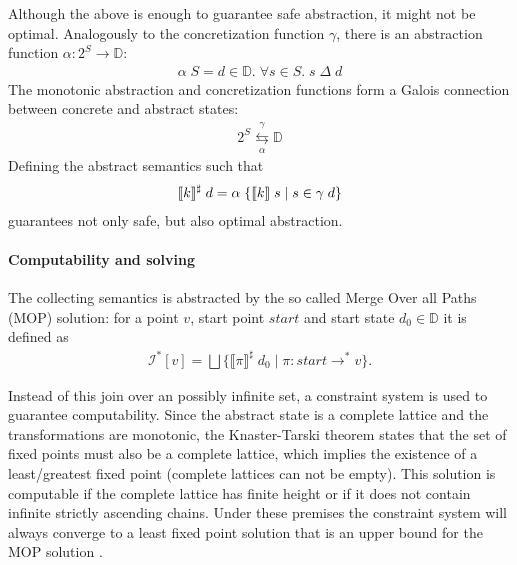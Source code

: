 Although the above is enough to guarantee safe abstraction, it might not be optimal.
Analogously to the concretization function $\gamma$, there is an abstraction function $\alpha : 2^S \to \mathbb{D}$:
\begin{align}
\alpha \; S = d \in \mathbb{D}. \; \forall s \in S. \; s \;\Delta\; d
\end{align}
The monotonic abstraction and concretization functions form a Galois connection between concrete and abstract states:
\begin{align}
2^S \overset{\gamma}{\underset{\alpha} {\leftrightarrows}} \mathbb{D}
\end{align}
Defining the abstract semantics such that
\begin{align}
\llbracket k \rrbracket^\sharp \; d = \alpha \; \{ \llbracket k \rrbracket \; s \; | \; s \in \gamma \; d\}
\end{align}
guarantees not only safe, but also optimal abstraction.


\paragraph*{Computability and solving}
The collecting semantics is abstracted by the so called Merge Over all Paths (MOP) solution: for a point $v$, start point $start$ and start state $d_0 \in \mathbb{D}$ it is defined as
\begin{align}
\mathcal{I}^*[v] = \bigsqcup \{\llbracket \pi \rrbracket^\sharp \; d_0 \; | \; \pi : start \to^* v\}.
\end{align}

Instead of this join over an possibly infinite set, a constraint system is used to guarantee computability.
Since the abstract state is a complete lattice and the transformations are monotonic, the Knaster-Tarski theorem states that the set of fixed points must also be a complete lattice, which implies the existence of a least/greatest fixed point (complete lattices can not be empty).
This solution is computable if the complete lattice has finite height or if it does not contain infinite strictly ascending chains.
Under these premises the constraint system will always converge to a least fixed point solution that is an upper bound for the MOP solution \cite{kam1977monotone, Kam:1976:GDF:321921.321938}. %

